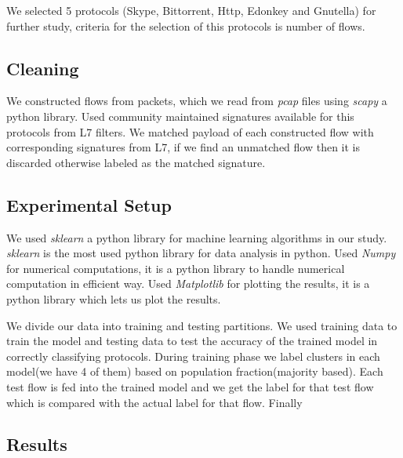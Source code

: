 \documentclass[conference]{IEEEtran}
\begin{document}
We selected 5 protocols (Skype, Bittorrent, Http, Edonkey and Gnutella) for further study, criteria for the selection of this protocols is number of flows.
\subsection{Cleaning}
We constructed flows from packets, which we read from \emph{pcap} files using \emph{scapy}\cite{scapy} a python library. Used community maintained signatures\cite{L7:2007:misc} available for this protocols from L7 filters. We matched payload of each constructed flow with corresponding signatures from L7, if we find an unmatched flow then it is discarded otherwise labeled as the matched signature.

\subsection{Experimental Setup}
We used \emph{sklearn}\cite{scikit-learn} a python library for machine learning algorithms in our study. \emph{sklearn}\cite{scikit-learn} is the most used python library for data analysis in python. Used \emph{Numpy}\cite{numpy} for numerical computations, it is a python library to handle numerical computation in efficient way. Used \emph{Matplotlib} for plotting the results, it is a python library which lets us plot the results.

We divide our data into training and testing partitions. We used training data to train the model and testing data to test the accuracy of the trained model in correctly classifying protocols.
During training phase we label clusters in each model(we have 4 of them) based on population fraction(majority based). Each test flow is fed into the trained model and we get the label for that test flow which is compared with the actual label for that flow. Finally


\subsection{Results}
\end{document}
